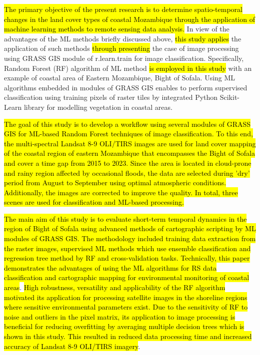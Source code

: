 \documentclass[coasts,article,submit,pdftex,moreauthors]{Definitions/mdpi}
\begin{document}
\hl{The primary objective of the present research is to determine spatio-temporal changes in the land cover types of coastal Mozambique through the application of machine learning methods to remote sensing data analysis. }In view of the advantages of the ML methods briefly discussed above, \hl{this study applies} the application of such methods \hl{through presenting} the case of image processing using GRASS GIS module of r.learn.train for image classification. Specifically,\hl{ }Random Forest (RF) algorithm of ML method\hl{ is employed in this study }with an example of coastal area of Eastern Mozambique, Bight of Sofala. Using ML algorithms embedded in modules of GRASS GIS enables to perform supervised classification using training pixels of raster tiles by integrated Python Scikit-Learn library \cite{Pedregosa} for modelling vegetation in coastal areas. 

\hl{The goal of this study is to develop a workflow using several modules of GRASS GIS for ML-based Random Forest techniques of image classification. To this end, the multi-spectral Landsat 8-9 OLI/TIRS images are used for land cover mapping of the coastal region of eastern Mozambique that encompasses the Bight of Sofala and cover a time gap from 2015 to 2023. Since the area is located in cloud-prone and rainy region affected by occasional floods, the data are selected during 'dry' period from August to September using optimal atmospheric conditions. Additionally, the images are corrected to improve the quality. In total, three scenes are used for classification and ML-based processing.}

\hl{The main aim of this study is to evaluate short-term temporal dynamics in the region of Bight of Sofala using advanced methods of cartographic scripting by ML modules of GRASS GIS. The methodology included training data extraction from the raster images, supervised ML methods which use ensemble classification and regression tree method by RF and cross-validation tasks. Technically, this paper demonstrates the advantages of using the ML algorithms for RS data classification and cartographic mapping for environmental monitoring of coastal areas}. \hl{High robustness, versatility and applicability of the RF algorithm motivated its application for processing satellite images in the shoreline regions where sensitive environmental parameters exist. Due to the sensitivity of RF to noise and outliers in the pixel matrix, its application to image processing is beneficial for reducing overfitting by averaging multiple decision trees which is shown in this study. This resulted in reduced data processing time and increased accuracy of Landsat 8-9 OLI/TIRS imagery}. 
\end{document}

